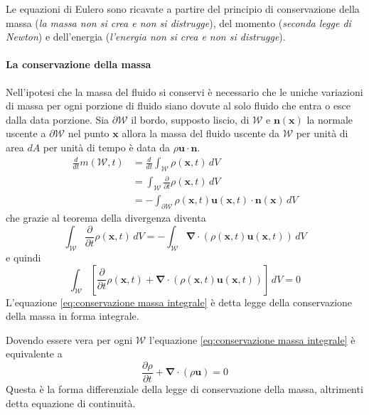 \documentclass{book}
\newcommand{\Nabla}{\boldsymbol{\nabla}}
\begin{document}
Le equazioni di Eulero sono ricavate a partire del principio di conservazione della massa (\emph{la massa non si crea e non si distrugge}), del momento (\emph{seconda legge di Newton}) e dell'energia (\emph{l'energia non si crea e non si distrugge}).

\paragraph{La conservazione della massa}
Nell'ipotesi che la massa del fluido si conservi è necessario che le uniche variazioni di massa per ogni porzione di fluido siano dovute al solo fluido che entra o esce dalla data porzione. Sia $\partial \mathcal{W}$ il bordo, supposto liscio, di  $\mathcal{W}$ e $\mathbf{n}(\mathbf{x})$ la normale uscente a $\partial \mathcal{W}$ nel punto $\mathbf{x}$ allora la massa del fluido uscente da $\mathcal{W}$ per unità di area $dA$ per unità di tempo è data da $\rho \mathbf{u}\cdot \mathbf{n}$.
\begin{equation*}  
\begin{split}
\frac{d}{dt} m(\mathcal{W},t) &= \frac{d}{dt}  \int_{\mathcal{W}}\rho(\mathbf{x},t) \, dV \\
                              &= \int_{\mathcal{W}}\frac{\partial}{\partial t}\rho(\mathbf{x},t) \, dV \\
                              &= - \int_{\partial \mathcal{W}}\rho(\mathbf{x},t) \mathbf{u}(\mathbf{x},t) \cdot \mathbf{n}(\mathbf{x}) \, dV
\end{split}
\end{equation*}
che grazie al teorema della divergenza diventa
\begin{equation*}
\int_{\mathcal{W}}\frac{\partial}{\partial t}\rho(\mathbf{x},t) \, dV = -\int_{\mathcal{W}}\Nabla \cdot \left (\rho(\mathbf{x},t) \mathbf{u}(\mathbf{x},t) \right ) \, dV
\end{equation*}
e quindi
\begin{equation}\label{eq:conservazione massa integrale}
\boxed{
\int_{\mathcal{W}}\left [ \frac{\partial}{\partial t}\rho(\mathbf{x},t) + \Nabla \cdot (\rho(\mathbf{x},t) \mathbf{u}(\mathbf{x},t)) \right ]\, dV = 0
}
\end{equation}
L'equazione \ref{eq:conservazione massa integrale} è detta legge della conservazione della massa in forma integrale.

Dovendo essere vera per ogni $\mathcal{W}$ l'equazione \ref{eq:conservazione massa integrale} è equivalente a 
\begin{equation}\label{eq:conservazione massa differenziale}
\boxed{
\frac{\partial \rho}{\partial t} + \Nabla \cdot (\rho \mathbf{u}) = 0
}
\end{equation}
Questa è la forma differenziale della legge di conservazione della massa, altrimenti detta equazione di continuità.
\end{document}
